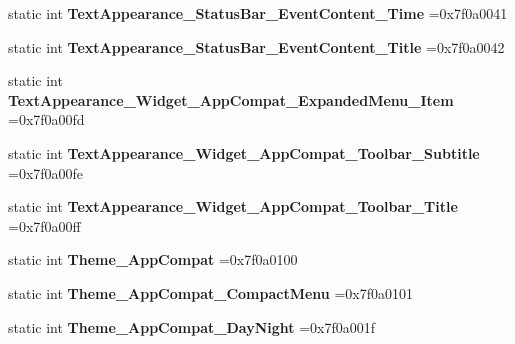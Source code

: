 \begin{DoxyCompactItemize}
\item 
\mbox{\label{classandroid_1_1support_1_1v4_1_1R_1_1style_a751384d0f4d6b5cfab060723a113c59b}} 
static int {\bfseries Text\+Appearance\+\_\+\+Status\+Bar\+\_\+\+Event\+Content\+\_\+\+Time} =0x7f0a0041
\item 
\mbox{\label{classandroid_1_1support_1_1v4_1_1R_1_1style_a58f22b4fe175c3ae0a74a0a63e6fdb5e}} 
static int {\bfseries Text\+Appearance\+\_\+\+Status\+Bar\+\_\+\+Event\+Content\+\_\+\+Title} =0x7f0a0042
\item 
\mbox{\label{classandroid_1_1support_1_1v4_1_1R_1_1style_af7a3d2152aaee2a7a40497ad14b1d562}} 
static int {\bfseries Text\+Appearance\+\_\+\+Widget\+\_\+\+App\+Compat\+\_\+\+Expanded\+Menu\+\_\+\+Item} =0x7f0a00fd
\item 
\mbox{\label{classandroid_1_1support_1_1v4_1_1R_1_1style_ac0450314881ac21211779e2e535583f9}} 
static int {\bfseries Text\+Appearance\+\_\+\+Widget\+\_\+\+App\+Compat\+\_\+\+Toolbar\+\_\+\+Subtitle} =0x7f0a00fe
\item 
\mbox{\label{classandroid_1_1support_1_1v4_1_1R_1_1style_a43d87b3814ed2685f2823a26694e87ee}} 
static int {\bfseries Text\+Appearance\+\_\+\+Widget\+\_\+\+App\+Compat\+\_\+\+Toolbar\+\_\+\+Title} =0x7f0a00ff
\item 
\mbox{\label{classandroid_1_1support_1_1v4_1_1R_1_1style_a68eba2f8d3ecbf8d6d0645100a0ff105}} 
static int {\bfseries Theme\+\_\+\+App\+Compat} =0x7f0a0100
\item 
\mbox{\label{classandroid_1_1support_1_1v4_1_1R_1_1style_af8696d283c2e8732f27e01cc2e46e200}} 
static int {\bfseries Theme\+\_\+\+App\+Compat\+\_\+\+Compact\+Menu} =0x7f0a0101
\item 
\mbox{\label{classandroid_1_1support_1_1v4_1_1R_1_1style_a14d0900c54001149d7b7073dc317c93f}} 
static int {\bfseries Theme\+\_\+\+App\+Compat\+\_\+\+Day\+Night} =0x7f0a001f

\end{DoxyCompactItemize}
